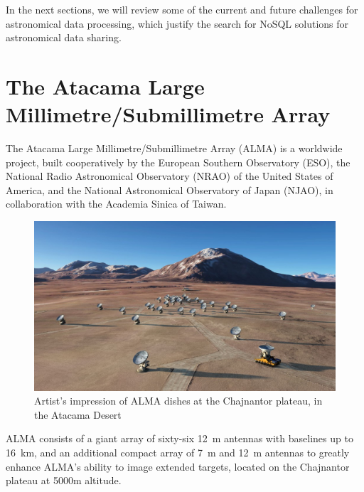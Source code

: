 In the next sections, we will review some of the current and future challenges for astronomical data processing, which justify the search for NoSQL solutions for astronomical data sharing.

\section{The Atacama Large Millimetre/Submillimetre Array}

The Atacama Large Millimetre/Submillimetre Array (ALMA) %
is a worldwide project, %
built cooperatively by the European Southern Observatory (ESO), the National Radio Astronomical Observatory (NRAO) of the United States of America, and the National Astronomical Observatory of Japan (NJAO), in collaboration with the Academia Sinica of Taiwan.

 \begin{figure}[tb]
 \centering
 \includegraphics[width=\textwidth]{images/alma.jpg}
 \caption{Artist's impression of ALMA dishes at the Chajnantor plateau, in the Atacama Desert}
 \end{figure}


ALMA
consists of a giant array of
sixty-six
12~m antennas with baselines up to
16~km,
and an additional compact array of
7~m
and
12~m antennas to greatly enhance ALMA's ability to image extended targets, located on the Chajnantor plateau at 5000m altitude.

